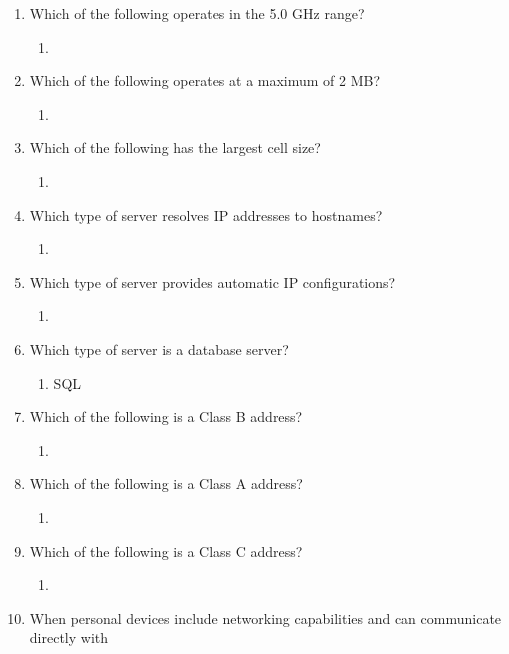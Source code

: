 \documentclass{article}
\begin{document}
\begin{enumerate}
    \item Which of the following operates in the 5.0 GHz range?
    \begin{enumerate}
        \item 
    \end{enumerate}
    \item Which of the following operates at a maximum of 2 MB?
    \begin{enumerate}
        \item 
    \end{enumerate}
    \item Which of the following has the largest cell size?
    \begin{enumerate}
        \item 
    \end{enumerate}
    \item Which type of server resolves IP addresses to hostnames?
    \begin{enumerate}
        \item 
    \end{enumerate}
    \item Which type of server provides automatic IP configurations?
    \begin{enumerate}
        \item 
    \end{enumerate}
    \item Which type of server is a database server?
    \begin{enumerate}
        \item SQL
    \end{enumerate}
    \item Which of the following is a Class B address?
    \begin{enumerate}
        \item 
    \end{enumerate}
    \item Which of the following is a Class A address?
    \begin{enumerate}
        \item 
    \end{enumerate}
    \item Which of the following is a Class C address?
    \begin{enumerate}
        \item 
    \end{enumerate}
    \item When personal devices include networking capabilities and can communicate directly with

\end{enumerate}
\end{document}
